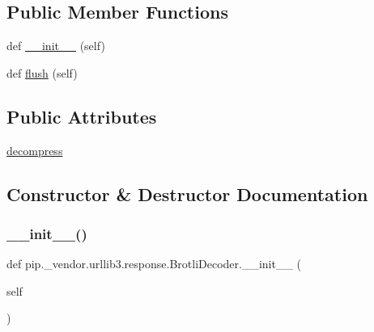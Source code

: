 \subsection*{Public Member Functions}
\begin{DoxyCompactItemize}
\item 
def \hyperlink{classpip_1_1__vendor_1_1urllib3_1_1response_1_1BrotliDecoder_a4b5793ec884a5662fcca334f7d88b9ea}{\+\_\+\+\_\+init\+\_\+\+\_\+} (self)
\item 
def \hyperlink{classpip_1_1__vendor_1_1urllib3_1_1response_1_1BrotliDecoder_a66b005d5f3079b203f410962f743261f}{flush} (self)
\end{DoxyCompactItemize}
\subsection*{Public Attributes}
\begin{DoxyCompactItemize}
\item 
\hyperlink{classpip_1_1__vendor_1_1urllib3_1_1response_1_1BrotliDecoder_ac0d4d7d564f5a89541d717d16f78eedb}{decompress}
\end{DoxyCompactItemize}


\subsection{Constructor \& Destructor Documentation}
\mbox{\label{classpip_1_1__vendor_1_1urllib3_1_1response_1_1BrotliDecoder_a4b5793ec884a5662fcca334f7d88b9ea}} 
\subsubsection{\texorpdfstring{\+\_\+\+\_\+init\+\_\+\+\_\+()}{\_\_init\_\_()}}
{\footnotesize\ttfamily def pip.\+\_\+vendor.\+urllib3.\+response.\+Brotli\+Decoder.\+\_\+\+\_\+init\+\_\+\+\_\+ (\begin{DoxyParamCaption}\item[{}]{self }\end{DoxyParamCaption})}



